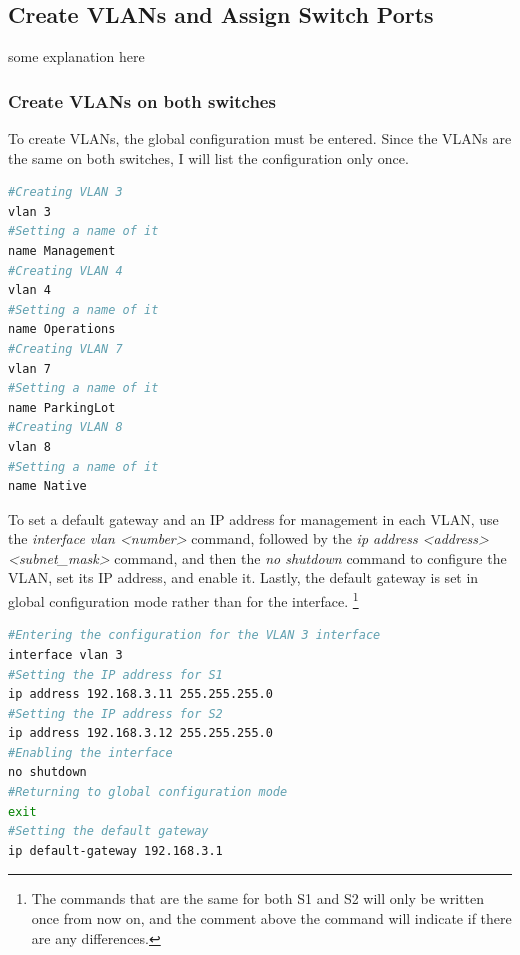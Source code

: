 \documentclass[a4paper]{article}
\newcommand{\ii}{\textit}
\begin{document}
\subsection{Create VLANs and Assign Switch Ports}
some explanation here
\subsubsection{Create VLANs on both switches}
To create VLANs, the global configuration must be entered. Since the VLANs are the same on both switches, I will list the configuration only once.
\begin{lstlisting}[language=bash]
#Creating VLAN 3
vlan 3
#Setting a name of it
name Management
#Creating VLAN 4
vlan 4
#Setting a name of it
name Operations
#Creating VLAN 7
vlan 7
#Setting a name of it
name ParkingLot
#Creating VLAN 8
vlan 8
#Setting a name of it
name Native
\end{lstlisting}
To set a default gateway and an IP address for management in each VLAN, use the \ii{interface vlan <number>} command, followed by the \ii{ip address <address> <subnet\_mask>} command, and then the \ii{no shutdown} command to configure the VLAN, set its IP address, and enable it.
Lastly, the default gateway is set in global configuration mode rather than for the interface. \footnote{The commands that are the same for both S1 and S2 will only be written once from now on, and the comment above the command will indicate if there are any differences.}
\begin{lstlisting}[language=bash]
#Entering the configuration for the VLAN 3 interface
interface vlan 3
#Setting the IP address for S1
ip address 192.168.3.11 255.255.255.0
#Setting the IP address for S2
ip address 192.168.3.12 255.255.255.0
#Enabling the interface
no shutdown
#Returning to global configuration mode
exit
#Setting the default gateway
ip default-gateway 192.168.3.1
\end{lstlisting}
\end{document}
